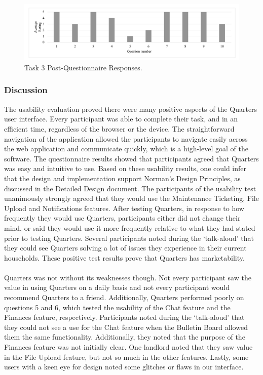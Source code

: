 \documentclass[12pt]{article}
\begin{document}
\begin{figure}[h]
    \centering
    \includegraphics[width=1\textwidth]{figures/task3.png}
    \caption{Task 3 Post-Questionnaire Responses.}
    \label{fig:task3}
\end{figure}

\subsubsection{Discussion}
The usability evaluation proved there were many positive aspects of the Quarters user interface. Every participant was able to complete their task, and in an efficient time, regardless of the browser or the device. The straightforward navigation of the application allowed the participants to navigate easily across the web application and communicate quickly, which is a high-level goal of the software. The questionnaire results showed that participants agreed that Quarters was easy and intuitive to use. Based on these usability results, one could infer that the design and implementation support Norman’s Design Principles, as discussed in the Detailed Design document. The participants of the usability test unanimously strongly agreed that they would use the Maintenance Ticketing, File Upload and Notifications features. After testing Quarters, in response to how frequently they would use Quarters, participants either did not change their mind, or said they would use it more frequently relative to what they had stated prior to testing Quarters. Several participants noted during the ‘talk-aloud’ that they could see Quarters solving a lot of issues they experience in their current households. These positive test results prove that Quarters has marketability. \\ \\
Quarters was not without its weaknesses though. Not every participant saw the value in using Quarters on a daily basis and not every participant would recommend Quarters to a friend. Additionally, Quarters performed poorly on questions 5 and 6, which tested the usability of the Chat feature and the Finances feature, respectively. Participants noted during the ‘talk-aloud’ that they could not see a use for the Chat feature when the Bulletin Board allowed them the same functionality. Additionally, they noted that the purpose of the Finances feature was not initially clear. One landlord noted that they saw value in the File Upload feature, but not so much in the other features. Lastly, some users with a keen eye for design noted some glitches or flaws in our interface. \\ \\
\end{document}
